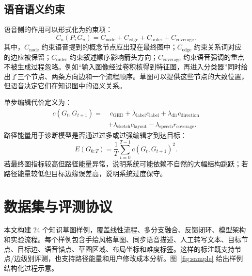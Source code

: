\documentclass[UTF8,a4paper,12pt,fontset=fandol]{ctexart}
\begin{document}
\subsection{语音语义约束}

语音侧的作用可以形式化为约束项：
\begin{equation}
  C_u(P;G_u)=C_{\mathrm{node}}+C_{\mathrm{edge}}+C_{\mathrm{order}}+C_{\mathrm{coverage}}.
\end{equation}
其中，$C_{\mathrm{node}}$ 约束语音提到的概念节点应出现在最终图中；$C_{\mathrm{edge}}$ 约束关系词对应的边应被保留；$C_{\mathrm{order}}$ 约束叙述顺序影响箭头方向；$C_{\mathrm{coverage}}$ 约束语音强调的重点不被生成过程忽略。例如“输入图像经过卷积核得到特征图，再进入分类器”同时给出了三个节点、两条方向边和一个流程顺序。草图可以提供这些节点的大致位置，但语音决定它们在知识图中的语义关系。

单步编辑代价定义为：
\begin{equation}
\begin{aligned}
  c(G_t,G_{t+1}) = &\; c_{\mathrm{GED}}
  + \lambda_{\mathrm{label}} c_{\mathrm{label}}
  + \lambda_{\mathrm{dir}} c_{\mathrm{direction}} \\
  &+ \lambda_{\mathrm{sketch}} c_{\mathrm{layout}}
  - \lambda_{\mathrm{speech}} r_{\mathrm{coverage}} .
\end{aligned}
\end{equation}
路径能量用于诊断模型是否通过过多或过强编辑才到达目标：
\begin{equation}
  E(G_{0:T})=\frac{1}{T}\sum_{t=0}^{T-1} c(G_t,G_{t+1})^2 .
\end{equation}
若最终图指标较高但路径能量异常，说明系统可能依赖不自然的大幅结构跳跃；若路径能量较低但目标边缘误差高，说明系统过度保守。

\section{数据集与评测协议}

本文构建 24 个知识草图样例，覆盖线性流程、多分支融合、反馈闭环、模型架构和实验流程。每个样例包含手绘风格草图、同步语音描述、人工转写文本、目标节点、目标边、语音锚点、草图区域、布局坐标和难度标签。这样的标注既支持节点/边级别评测，也支持路径能量和用户修改成本分析。图~\ref{fig:sample} 给出样例结构化过程示意。
\end{document}

